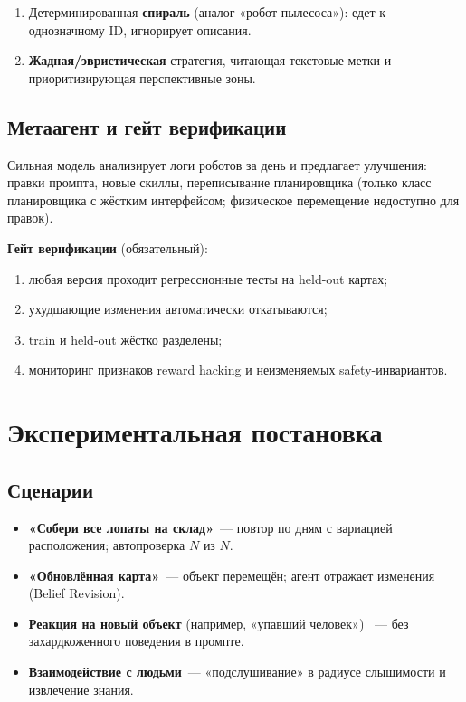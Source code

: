 \documentclass[11pt,a4paper]{article}
\begin{document}
\begin{enumerate}[leftmargin=*]
  \item Детерминированная \textbf{спираль} (аналог «робот-пылесоса»): едет
        к однозначному ID, игнорирует описания.
  \item \textbf{Жадная/эвристическая} стратегия, читающая текстовые метки
        и приоритизирующая перспективные зоны.
\end{enumerate}

\subsection{Метаагент и гейт верификации}

Сильная модель анализирует логи роботов за день и предлагает улучшения:
правки промпта, новые скиллы, переписывание планировщика
(только класс планировщика с жёстким интерфейсом; физическое перемещение
недоступно для правок).

\textbf{Гейт верификации} (обязательный):
\begin{enumerate}[leftmargin=*]
  \item любая версия проходит регрессионные тесты на held-out картах;
  \item ухудшающие изменения автоматически откатываются;
  \item train и held-out жёстко разделены;
  \item мониторинг признаков reward hacking и неизменяемых safety-инвариантов.
\end{enumerate}

\section{Экспериментальная постановка}
\label{sec:setup}

\subsection{Сценарии}

\begin{itemize}[leftmargin=*]
  \item \textbf{«Собери все лопаты на склад»}~--- повтор по дням с вариацией
        расположения; автопроверка \(N\) из \(N\).
  \item \textbf{«Обновлённая карта»}~--- объект перемещён; агент отражает
        изменения (Belief Revision).
  \item \textbf{Реакция на новый объект} (например, «упавший человек»)~
        --- без захардкоженного поведения в промпте.
  \item \textbf{Взаимодействие с людьми}~--- «подслушивание» в радиусе
        слышимости и извлечение знания.
\end{itemize}
\end{document}
